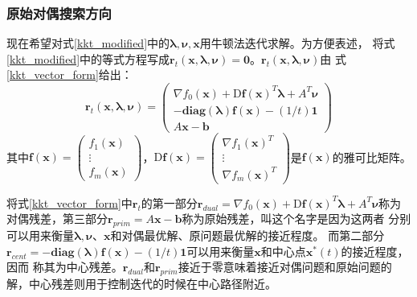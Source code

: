 \documentclass{article}
\begin{document}
\subsubsection{原始对偶搜索方向}
现在希望对式\eqref{kkt_modified}中的$\bm\lambda,\bm\nu,\bm x$用牛顿法迭代求解。为方便表述，
将式\eqref{kkt_modified}中的等式方程写成$\bm r_t(\bm x,\bm\lambda,\bm\nu)=\bm 0$。$\bm r_t(\bm x,\bm\lambda,\bm\nu)$由
式\eqref{kkt_vector_form}给出：
\begin{equation}
\label{kkt_vector_form}
\bm r_t(\bm x,\bm\lambda,\bm\nu)=\begin{pmatrix}
    \nabla f_0(\bm x)+\text{D}\textbf{f}(\bm x)^T\bm\lambda+A^T\bm\nu \\
    -\textbf{diag}(\bm\lambda)\textbf{f}(\bm x)-(1/t)\bm 1 \\
    A\bm x-\bm b
\end{pmatrix}
\end{equation}
其中$\textbf{f}(\bm x)=\begin{pmatrix}
    f_1(\bm x) \\
    \vdots \\
    f_m(\bm x)
\end{pmatrix}$，$\text{D}\textbf{f}(\bm x)=\begin{pmatrix}
    \nabla f_1(\bm x)^T \\
    \vdots \\
    \nabla f_m(\bm x)^T
\end{pmatrix}$是$\textbf{f}(\bm x)$的雅可比矩阵。

将式\eqref{kkt_vector_form}中$\bm r_t$的第一部分$\bm r_{dual}=\nabla f_0(\bm x)+\text{D}\textbf{f}(\bm x)^T\bm\lambda+A^T\bm\nu$称为对偶残差，第三部分$\bm r_{prim}=A\bm x-\bm b$称为原始残差，叫这个名字是因为这两者
分别可以用来衡量$\bm\lambda,\bm\nu$、$\bm x$和对偶最优解、原问题最优解的接近程度。
而第二部分$\bm r_{cent}=-\textbf{diag}(\bm\lambda)\textbf{f}(\bm x)-(1/t)\bm 1$可以用来衡量$\bm x$和中心点$\bm x^*(t)$的接近程度，因而
称其为中心残差。$\bm r_{dual}$和$\bm r_{prim}$接近于零意味着接近对偶问题和原始问题的解，中心残差则用于控制迭代的时候在中心路径附近。
\end{document}
